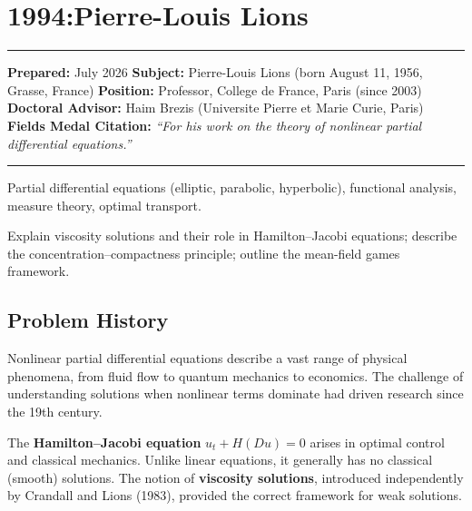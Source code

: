 \chapter{1994:Pierre-Louis Lions}\label{ch1994pierrelouislions:pierre-louis-lions-fields-medal-1994-a-comprehensive-report-on-his-work-and-impact}

\begin{center}\rule{0.5\linewidth}{0.5pt}\end{center}

\textbf{Prepared:} July 2026
\textbf{Subject:} Pierre-Louis Lions (born August 11, 1956, Grasse, France)
\textbf{Position:} Professor, College de France, Paris (since 2003)
\textbf{Doctoral Advisor:} Haim Brezis (Universite Pierre et Marie Curie, Paris)
\textbf{Fields Medal Citation:} \emph{``For his work on the theory of
nonlinear partial differential equations.''}

\begin{center}\rule{0.5\linewidth}{0.5pt}\end{center}

\begin{prereqs}
Partial differential equations (elliptic, parabolic, hyperbolic),
functional analysis, measure theory, optimal transport.
\end{prereqs}

\begin{objectives}
Explain viscosity solutions and their role in Hamilton--Jacobi
equations; describe the concentration--compactness principle;
outline the mean-field games framework.
\end{objectives}

\section{Problem History}

Nonlinear partial differential equations describe a vast range of
physical phenomena, from fluid flow to quantum mechanics to
economics.  The challenge of understanding solutions when nonlinear
terms dominate had driven research since the 19th century.

The \textbf{Hamilton--Jacobi equation} $u_t + H(Du) = 0$ arises in
optimal control and classical mechanics.  Unlike linear equations,
it generally has no classical (smooth) solutions.  The notion of
\textbf{viscosity solutions}, introduced independently by Crandall
and Lions (1983), provided the correct framework for weak solutions.

